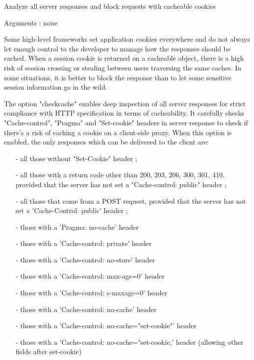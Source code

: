 
  Analyze all server responses and block requests with cacheable cookies


  Arguments : none

  Some high-level frameworks set application cookies everywhere and do not
  always let enough control to the developer to manage how the responses should
  be cached. When a session cookie is returned on a cacheable object, there is a
  high risk of session crossing or stealing between users traversing the same
  caches. In some situations, it is better to block the response than to let
  some sensitive session information go in the wild.

  The option "checkcache" enables deep inspection of all server responses for
  strict compliance with HTTP specification in terms of cacheability. It
  carefully checks "Cache-control", "Pragma" and "Set-cookie" headers in server
  response to check if there's a risk of caching a cookie on a client-side
  proxy. When this option is enabled, the only responses which can be delivered
  to the client are:

\begin{itemize}
\item[-] all those without "Set-Cookie" header ;
\item[-] all those with a return code other than 200, 203, 206, 300, 301, 410,
      provided that the server has not set a "Cache-control: public" header ;
\item[-] all those that come from a POST request, provided that the server has not
      set a 'Cache-Control: public' header ;
\item[-] those with a 'Pragma: no-cache' header
\item[-] those with a 'Cache-control: private' header
\item[-] those with a 'Cache-control: no-store' header
\item[-] those with a 'Cache-control: max-age=0' header
\item[-] those with a 'Cache-control: s-maxage=0' header
\item[-] those with a 'Cache-control: no-cache' header
\item[-] those with a 'Cache-control: no-cache="set-cookie"' header
\item[-] those with a 'Cache-control: no-cache="set-cookie,' header
      (allowing other fields after set-cookie)
\end{itemize}

